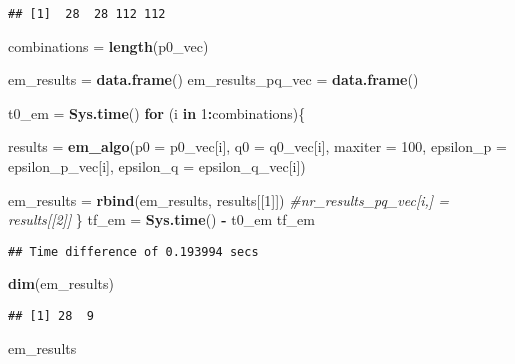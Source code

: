 \documentclass[]{article}
\newenvironment{Shaded}{\begin{snugshade}}{\end{snugshade}}
\newcommand{\KeywordTok}[1]{\textcolor[rgb]{0.13,0.29,0.53}{\textbf{#1}}}
\newcommand{\DataTypeTok}[1]{\textcolor[rgb]{0.13,0.29,0.53}{#1}}
\newcommand{\DecValTok}[1]{\textcolor[rgb]{0.00,0.00,0.81}{#1}}
\newcommand{\StringTok}[1]{\textcolor[rgb]{0.31,0.60,0.02}{#1}}
\newcommand{\CommentTok}[1]{\textcolor[rgb]{0.56,0.35,0.01}{\textit{#1}}}
\newcommand{\ControlFlowTok}[1]{\textcolor[rgb]{0.13,0.29,0.53}{\textbf{#1}}}
\newcommand{\OperatorTok}[1]{\textcolor[rgb]{0.81,0.36,0.00}{\textbf{#1}}}
\newcommand{\NormalTok}[1]{#1}
\begin{document}
\begin{verbatim}
## [1]  28  28 112 112
\end{verbatim}

\begin{Shaded}
\begin{Highlighting}[]
\NormalTok{combinations =}\StringTok{ }\KeywordTok{length}\NormalTok{(p0_vec)}

\NormalTok{em_results =}\StringTok{ }\KeywordTok{data.frame}\NormalTok{()}
\NormalTok{em_results_pq_vec =}\StringTok{ }\KeywordTok{data.frame}\NormalTok{()}

\NormalTok{t0_em =}\StringTok{ }\KeywordTok{Sys.time}\NormalTok{()}
\ControlFlowTok{for}\NormalTok{ (i }\ControlFlowTok{in} \DecValTok{1}\OperatorTok{:}\NormalTok{combinations)\{}
  
\NormalTok{  results =}\StringTok{ }\KeywordTok{em_algo}\NormalTok{(}\DataTypeTok{p0 =}\NormalTok{ p0_vec[i],  }
                    \DataTypeTok{q0 =}\NormalTok{ q0_vec[i], }
                    \DataTypeTok{maxiter =} \DecValTok{100}\NormalTok{, }
                    \DataTypeTok{epsilon_p =}\NormalTok{ epsilon_p_vec[i],}
                    \DataTypeTok{epsilon_q =}\NormalTok{ epsilon_q_vec[i])}
  
\NormalTok{  em_results =}\StringTok{ }\KeywordTok{rbind}\NormalTok{(em_results, results[[}\DecValTok{1}\NormalTok{]])}
  \CommentTok{#nr_results_pq_vec[i,] = results[[2]]}
\NormalTok{\}}
\NormalTok{tf_em =}\StringTok{ }\KeywordTok{Sys.time}\NormalTok{() }\OperatorTok{-}\StringTok{ }\NormalTok{t0_em}
\NormalTok{tf_em}
\end{Highlighting}
\end{Shaded}

\begin{verbatim}
## Time difference of 0.193994 secs
\end{verbatim}

\begin{Shaded}
\begin{Highlighting}[]
\KeywordTok{dim}\NormalTok{(em_results)}
\end{Highlighting}
\end{Shaded}

\begin{verbatim}
## [1] 28  9
\end{verbatim}

\begin{Shaded}
\begin{Highlighting}[]
\NormalTok{em_results}
\end{Highlighting}
\end{Shaded}
\end{document}
